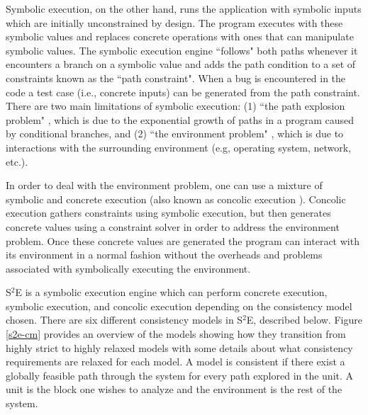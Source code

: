 \documentclass[conference]{IEEEtran}
\begin{document}
 Symbolic execution, on the other hand, runs the application with symbolic inputs \cite{klee} which are initially unconstrained by design. The program executes with these symbolic values and replaces concrete operations with ones that can manipulate symbolic values. The symbolic execution engine ``follows" both paths whenever it encounters a branch on a symbolic value and adds the path condition to a set of constraints known as the ``path constraint". When a bug is encountered in the code a test case (i.e., concrete inputs) can be generated from the path constraint. There are two main limitations of symbolic execution: (1) ``the path explosion problem" \cite{s2e}, which is due to the exponential growth of paths in a program caused by conditional branches, and (2) ``the environment problem" \cite{klee}, which is due to interactions with the surrounding environment (e.g, operating system, network, etc.).

 In order to deal with the environment problem, one can use a mixture of symbolic and concrete execution (also known as concolic execution \cite{cute}). Concolic execution gathers constraints using symbolic execution, but then generates concrete values using a constraint solver in order to address the environment problem. Once these concrete values are generated the program can interact with its environment in a normal fashion without the overheads and problems associated with symbolically executing the environment.

S$^2$E is a symbolic execution engine which can perform concrete execution, symbolic execution, and concolic execution depending on the consistency model chosen. There are six different consistency models in S$^2$E, described below. Figure \ref{s2e-cm} provides an overview of the models showing how they transition from highly strict to highly relaxed models with some details about what consistency requirements are relaxed for each model. A model is consistent if there exist a globally feasible path through the system for every path explored in the unit. A unit is the block one wishes to analyze and the environment is the rest of the system.
\end{document}

